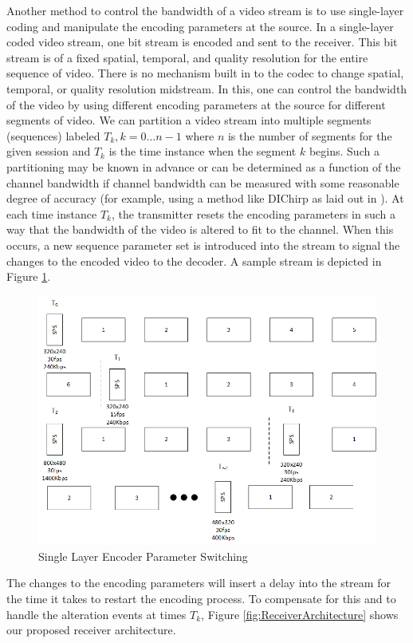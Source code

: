 \documentclass[a4paper,12pt]{article}
\begin{document}
Another method to control the bandwidth of a video stream is to use single-layer coding and manipulate the encoding parameters at the source. In a single-layer coded video stream, one bit stream is encoded and sent to the receiver. This bit stream is of a fixed spatial, temporal, and quality resolution for the entire sequence of video. There is no mechanism built in to the codec to change spatial, temporal, or quality resolution midstream. In this, one can control the bandwidth of the video by using different encoding parameters at the source for different segments of video. We can partition a video stream into multiple segments (sequences) labeled $T_k,k=0\ldots{n-1}$ where $n$ is the number of segments for the given session and $T_k$ is the time instance when the segment $k$ begins. Such a partitioning may be known in advance or can be determined as a function of the channel bandwidth if channel bandwidth can be measured with some reasonable degree of accuracy (for example, using a method like DIChirp as laid out in \cite{DIChirp}). At each time instance $T_k$, the transmitter resets the encoding parameters in such a way that the bandwidth of the video is altered to fit to the channel. When this occurs, a new sequence parameter set is introduced into the stream to signal the changes to the encoded video to the decoder. A sample stream is depicted in Figure \ref{fig:SingleLayerSwitching}.
\begin{figure}[h]
\centering
\includegraphics[width=0.8\linewidth]{SingleLayerParameterSwitching.png}
\caption{Single Layer Encoder Parameter Switching}
\label{fig:SingleLayerSwitching}
\end{figure}
The changes to the encoding parameters will insert a delay into the stream for the time it takes to restart the encoding process. To compensate for this and to handle the alteration events at times $T_k$, Figure \ref{fig:ReceiverArchitecture} shows our proposed receiver architecture.
\end{document}
